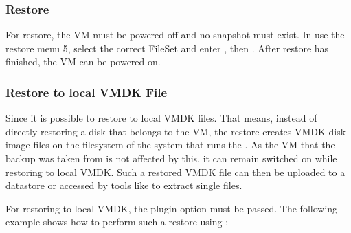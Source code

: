 
\subsubsection{Restore}

For restore, the VM must be powered off and no snapshot must exist.
In  use the restore menu 5, select the correct FileSet
and enter , then . After restore has finished,
the VM can be powered on.

\subsubsection{Restore to local VMDK File}

Since 
it is possible to restore to local VMDK files. That means, instead of directly
restoring a disk that belongs to the VM, the restore creates VMDK disk image files
on the filesystem of the system that runs the \bareosFd. As the VM that the backup
was taken from is not affected by this, it can remain switched on while restoring
to local VMDK. Such a restored VMDK file can then be uploaded to a \vSphere datastore
or accessed by tools like  to extract single files.

For restoring to local VMDK, the plugin option  must be passed.
The following example shows how to perform such a restore using :

